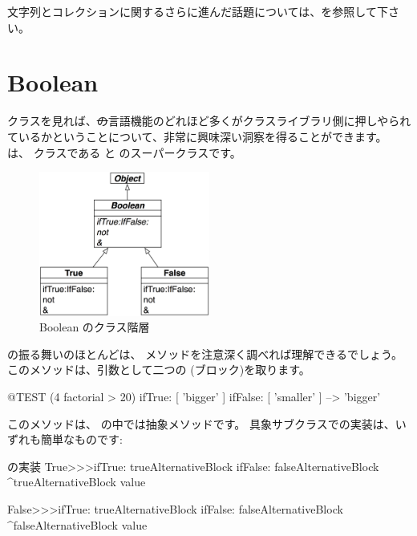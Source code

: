 \documentclass[a4paper,10pt,twoside]{book}
\begin{document}
文字列とコレクションに関するさらに進んだ話題については、を参照して下さい。


\section{Boolean}

 クラスを見れば、\st の言語機能のどれほど多くがクラスライブラリ側に押しやられているかということについて、非常に興味深い洞察を得ることができます。 は、 クラスである  と  のスーパークラスです。

\begin{figure}[ht]
  {\centerline {\includegraphics[width=0.5\textwidth]{BooleanHierarchy}}}
\caption{Boolean のクラス階層 }
\end{figure}

 の振る舞いのほとんどは、 メソッドを注意深く調べれば理解できるでしょう。このメソッドは、引数として二つの  (ブロック)を取ります。

\begin{code}{@TEST}
(4 factorial > 20) ifTrue: [ 'bigger' ] ifFalse: [ 'smaller' ] --> 'bigger'
\end{code}

このメソッドは、 の中では抽象メソッドです。
具象サブクラスでの実装は、いずれも簡単なものです:

\begin{method}{ の実装}
True>>>ifTrue: trueAlternativeBlock ifFalse: falseAlternativeBlock 
    ^trueAlternativeBlock value

False>>>ifTrue: trueAlternativeBlock ifFalse: falseAlternativeBlock 
    ^falseAlternativeBlock value
\end{method}
\end{document}
